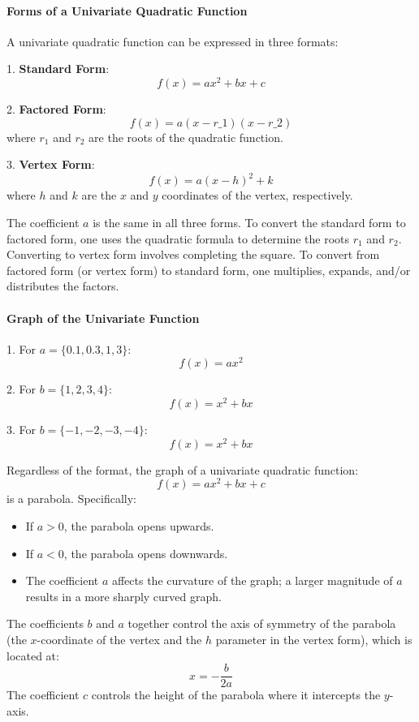 \paragraph{Forms of a Univariate Quadratic Function}

A univariate quadratic function can be expressed in three formats:

1. \textbf{Standard Form}:
   $$
   f(x) = ax^2 + bx + c
   $$

2. \textbf{Factored Form}:
   $$
   f(x) = a(x - r\_1)(x - r\_2)
   $$
   where $r_1$ and $r_2$ are the roots of the quadratic function.

3. \textbf{Vertex Form}:
   $$
   f(x) = a(x - h)^2 + k
   $$
   where $h$ and $k$ are the $x$ and $y$ coordinates of the vertex, respectively.

The coefficient $a$ is the same in all three forms. To convert the standard form to factored form, one uses the quadratic formula to determine the roots $r_1$ and $r_2$. Converting to vertex form involves completing the square. To convert from factored form (or vertex form) to standard form, one multiplies, expands, and/or distributes the factors.

\paragraph{Graph of the Univariate Function}

1. For $a = \{0.1, 0.3, 1, 3\}$:
   $$
   f(x) = ax^2
   $$

2. For $b = \{1, 2, 3, 4\}$:
   $$
   f(x) = x^2 + bx
   $$

3. For $b = \{-1, -2, -3, -4\}$:
   $$
   f(x) = x^2 + bx
   $$

Regardless of the format, the graph of a univariate quadratic function:
$$
f(x) = ax^2 + bx + c
$$
is a parabola. Specifically:

\begin{itemize}
    \item If $a > 0$, the parabola opens upwards.
    \item If $a < 0$, the parabola opens downwards.
    \item The coefficient $a$ affects the curvature of the graph; a larger magnitude of $a$ results in a more sharply curved graph.
\end{itemize}

The coefficients $b$ and $a$ together control the axis of symmetry of the parabola (the $x$-coordinate of the vertex and the $h$ parameter in the vertex form), which is located at:
$$
x = -\frac{b}{2a}
$$
The coefficient $c$ controls the height of the parabola where it intercepts the $y$-axis.

